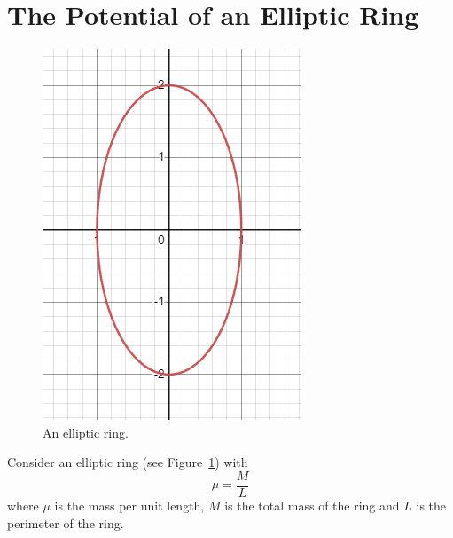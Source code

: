 \section{The Potential of an Elliptic Ring}

\begin{figure}[h!]
    \begin{center}
        \includegraphics[scale=0.5]{resources/elliptic_ring.png}
        \caption{An elliptic ring.}
        \label{potential::elliptic_ring}
    \end{center}
\end{figure}

Consider an elliptic ring (see Figure~\ref{potential::elliptic_ring}) with
\begin{equation}
    \mu = \frac{M}{L}
\end{equation}
where \( \mu \) is the mass per unit length, \( M \) is the total mass of the ring and \( L \) is the perimeter of the ring.

